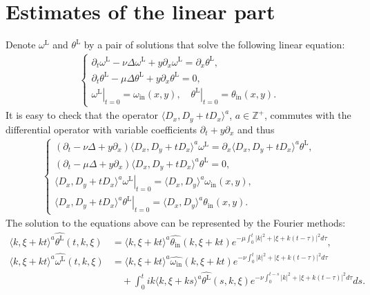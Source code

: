 \documentclass[reqno, 12pt]{amsart} %
\theoremstyle{plain} %
\theoremstyle{definition}
\theoremstyle{remark}
\numberwithin{equation}{section} %
\begin{document}
	\section{Estimates of the linear part} \label{sec.3}
	Denote $\omega^{\mathrm{L}}$ and $\theta^{\mathrm{L}}$ by a pair of solutions that solve the following linear equation:
	\begin{align} \label{eq:linear equ}
		\left\{\begin{array}{l}
			\partial_t \omega^{\mathrm{L}}-\nu \Delta \omega^{\mathrm{L}}+y \partial_x \omega^{\mathrm{L}}  = \partial_x \theta^{\mathrm{L}}  ,  \\
			\partial_t \theta^{\mathrm{L}}  -  \mu \Delta \theta^{\mathrm{L}}+y \partial_x \theta^{\mathrm{L}}  = 0  ,\\
			\left.\omega^{\mathrm{L}} \right|_{t=0}=\omega_{\text {in}}(x, y),\quad \left.\theta^{\mathrm{L}} \right|_{t=0}= \theta_{\text{in}}(x, y).
		\end{array}\right.
	\end{align}
	It is easy to check that the operator $\langle D_x, D_y + tD_x\rangle^a$, $a\in \mathbb{Z}^+$, commutes with the differential operator with variable coefficients $\partial_t+y \partial_x$ and thus
	\begin{align*} 
		\left\{\begin{array}{l}
			(\partial_t -\nu \Delta +y \partial_x) \langle D_x, D_y + tD_x\rangle^a  \omega^{\mathrm{L}}  = \partial_x \langle D_x, D_y + tD_x\rangle^a  \theta^{\mathrm{L}}  ,  \\
			(\partial_t   -  \mu \Delta +  y \partial_x ) \langle D_x, D_y + tD_x\rangle^a  \theta^{\mathrm{L}}  = 0  ,\\
			\left. \langle D_x, D_y + tD_x\rangle^a  \omega^{\mathrm{L}} \right|_{t=0}  =  \langle D_x, D_y \rangle^a  \omega_{\text {in}}(x, y),\\ \left. \langle D_x, D_y + tD_x\rangle^a  \theta^{\mathrm{L}} \right|_{t=0}= \langle D_x, D_y \rangle^a  \theta_{\text{in}}(x, y).
		\end{array}\right.
	\end{align*}
	The solution to the equations above can be represented by the Fourier methods:
	\begin{equation}
		\begin{aligned}\label{eq:solutions of the linear equ}
			\langle k, \xi + kt \rangle^a  \widehat{\theta^{\mathrm{L}} }(t, k, \xi)&  = \langle k, \xi + kt \rangle^a  \widehat{\theta_{\text {in}} }(k, \xi+k t) e^{-\mu \int_0^t|k|^2+|\xi+k(t-\tau)|^2 d \tau},\\
			\langle k, \xi + kt \rangle^a  \widehat{\omega^{\mathrm{L}} }(t, k, \xi)& = \langle k, \xi + kt \rangle^a  \widehat{\omega_{\text {in}} }(k, \xi+kt) e^{-\nu \int_0^t|k|^2+|\xi+k(t-\tau)|^2 d \tau}\\
			&\quad  + \int_0^t ik \langle k, \xi + ks \rangle^a  \widehat{\theta^{\mathrm{L}} }(s, k, \xi) e^{-\nu \int_0^{t-s} |k|^2+|\xi+k(t-\tau)|^2 d \tau} ds     .
		\end{aligned}
	\end{equation}
\end{document}
